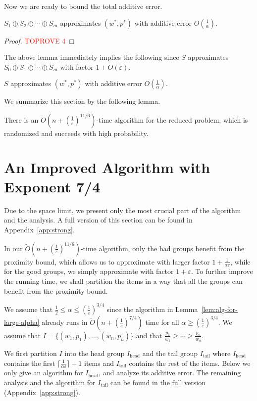 \documentclass[a4paper,UKenglish,cleveref, autoref, thm-restate, pdfa]{lipics-v2021}
\newcommand{\eps}{\varepsilon}
\renewcommand{\leq}{\leqslant}
\renewcommand{\geq}{\geqslant}
\begin{document}
Now we are ready to bound the total additive error.
\begin{lemma}\label{lem:total-err}
    $S_1 \oplus S_2 \oplus \cdots \oplus S_m$ approximates $(w^*, p^*)$ with additive error $O(\frac{1}{\alpha})$.
\end{lemma}
\begin{proof}\textcolor{red}{TOPROVE 4}\end{proof}

The above lemma immediately implies the following since $S$ approximates $S_0 \oplus S_1 \oplus \cdots \oplus S_m$ with factor $1 + O(\eps)$.
\begin{corollary}
    $S$ approximates $(w^*, p^*)$ with additive error $O(\frac{1}{\alpha})$.
\end{corollary}

We summarize this section by the following lemma.
\begin{lemma}
   There is an $\tilde{O}({n+(\frac{1}{\eps})^{11/6}})$-time algorithm for the reduced problem, which is randomized and succeeds with high probability.
\end{lemma}


\section{An Improved Algorithm with Exponent 7/4}\label{sec:strong}
Due to the space limit, we present only the most crucial part of the algorithm and the analysis. A full version of this section can be found in Appendix~\ref{app:strong}.

In our $\tilde{O}(n + (\frac{1}{\eps})^{11/6})$-time algorithm, only the bad groups benefit from the proximity bound, which allows us to approximate with larger factor $1 + \frac{1}{\alpha\tau}$, while for the good groups, we simply approximate with factor $1 + \eps$. To further improve the running time, we shall partition the items in a way that all the groups can benefit from the proximity bound.

We assume that $\frac{1}{2}\leq \alpha \leq (\frac{1}{\eps})^{3/4}$ since the algorithm in Lemma~\ref{lem:alg-for-large-alpha} already runs in $\tilde{O}(n + (\frac{1}{\eps})^{7/4})$ time for all $\alpha \geq (\frac{1}{\eps})^{3/4}$. We assume that $I = \{(w_1, p_1), \ldots, (w_n, p_n)\}$ and that $\frac{p_1}{w_1} \geq \cdots \geq \frac{p_n}{w_n}$.

We first partition $I$ into the head group $I_{\mathrm{head}}$ and the tail group $I_{\mathrm{tail}}$ where $I_{\mathrm{head}}$ contains the first $\lceil \frac{1}{\alpha\eps}\rceil + 1 $ items and $I_{\mathrm{tail}}$ contains the rest of the items. 
Below we only give an algorithm for $I_{\mathrm{head}}$, and analyze its additive error. The remaining analysis and the algorithm for $I_{\mathrm{tail}}$ can be found in the full version (Appendix~\ref{app:strong}).
\end{document}
